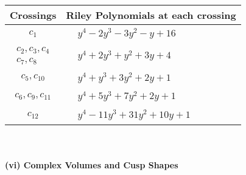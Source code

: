 \documentclass[1p]{elsarticle_modified}
\theoremstyle{definition}
\begin{document}
\begin{tabular}{m{50pt}|m{274pt}}
Crossings & \hspace{64pt}Riley Polynomials at each crossing \\
\hline $$\begin{aligned}c_{1}\end{aligned}$$&$\begin{aligned}
&y^4-2 y^3-3 y^2- y+16
\end{aligned}$\\
\hline $$\begin{aligned}c_{2},c_{3},c_{4}\\c_{7},c_{8}\end{aligned}$$&$\begin{aligned}
&y^4+2 y^3+y^2+3 y+4
\end{aligned}$\\
\hline $$\begin{aligned}c_{5},c_{10}\end{aligned}$$&$\begin{aligned}
&y^4+y^3+3 y^2+2 y+1
\end{aligned}$\\
\hline $$\begin{aligned}c_{6},c_{9},c_{11}\end{aligned}$$&$\begin{aligned}
&y^4+5 y^3+7 y^2+2 y+1
\end{aligned}$\\
\hline $$\begin{aligned}c_{12}\end{aligned}$$&$\begin{aligned}
&y^4-11 y^3+31 y^2+10 y+1
\end{aligned}$\\
\hline
\end{tabular}\\~\\
\newpage\flushleft \textbf{(vi) Complex Volumes and Cusp Shapes}
\end{document}
